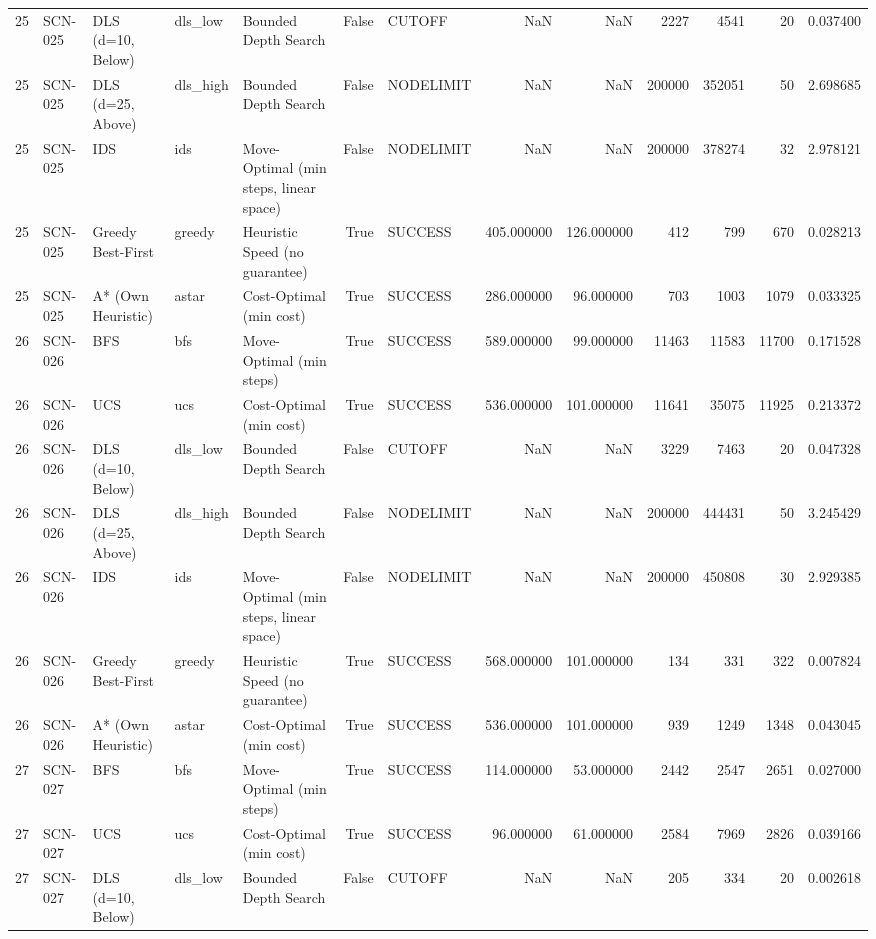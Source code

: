 \begin{table}[htbp]
\begin{tabular}{rllllrlrrrrrr}
25 & SCN-025 & DLS (d=10, Below) & dls\_low & Bounded Depth Search & False & CUTOFF & NaN & NaN & 2227 & 4541 & 20 & 0.037400 \\
25 & SCN-025 & DLS (d=25, Above) & dls\_high & Bounded Depth Search & False & NODELIMIT & NaN & NaN & 200000 & 352051 & 50 & 2.698685 \\
25 & SCN-025 & IDS & ids & Move-Optimal (min steps, linear space) & False & NODELIMIT & NaN & NaN & 200000 & 378274 & 32 & 2.978121 \\
25 & SCN-025 & Greedy Best-First & greedy & Heuristic Speed (no guarantee) & True & SUCCESS & 405.000000 & 126.000000 & 412 & 799 & 670 & 0.028213 \\
25 & SCN-025 & A* (Own Heuristic) & astar & Cost-Optimal (min cost) & True & SUCCESS & 286.000000 & 96.000000 & 703 & 1003 & 1079 & 0.033325 \\
26 & SCN-026 & BFS & bfs & Move-Optimal (min steps) & True & SUCCESS & 589.000000 & 99.000000 & 11463 & 11583 & 11700 & 0.171528 \\
26 & SCN-026 & UCS & ucs & Cost-Optimal (min cost) & True & SUCCESS & 536.000000 & 101.000000 & 11641 & 35075 & 11925 & 0.213372 \\
26 & SCN-026 & DLS (d=10, Below) & dls\_low & Bounded Depth Search & False & CUTOFF & NaN & NaN & 3229 & 7463 & 20 & 0.047328 \\
26 & SCN-026 & DLS (d=25, Above) & dls\_high & Bounded Depth Search & False & NODELIMIT & NaN & NaN & 200000 & 444431 & 50 & 3.245429 \\
26 & SCN-026 & IDS & ids & Move-Optimal (min steps, linear space) & False & NODELIMIT & NaN & NaN & 200000 & 450808 & 30 & 2.929385 \\
26 & SCN-026 & Greedy Best-First & greedy & Heuristic Speed (no guarantee) & True & SUCCESS & 568.000000 & 101.000000 & 134 & 331 & 322 & 0.007824 \\
26 & SCN-026 & A* (Own Heuristic) & astar & Cost-Optimal (min cost) & True & SUCCESS & 536.000000 & 101.000000 & 939 & 1249 & 1348 & 0.043045 \\
27 & SCN-027 & BFS & bfs & Move-Optimal (min steps) & True & SUCCESS & 114.000000 & 53.000000 & 2442 & 2547 & 2651 & 0.027000 \\
27 & SCN-027 & UCS & ucs & Cost-Optimal (min cost) & True & SUCCESS & 96.000000 & 61.000000 & 2584 & 7969 & 2826 & 0.039166 \\
27 & SCN-027 & DLS (d=10, Below) & dls\_low & Bounded Depth Search & False & CUTOFF & NaN & NaN & 205 & 334 & 20 & 0.002618 \\

\end{tabular}
\end{table}
